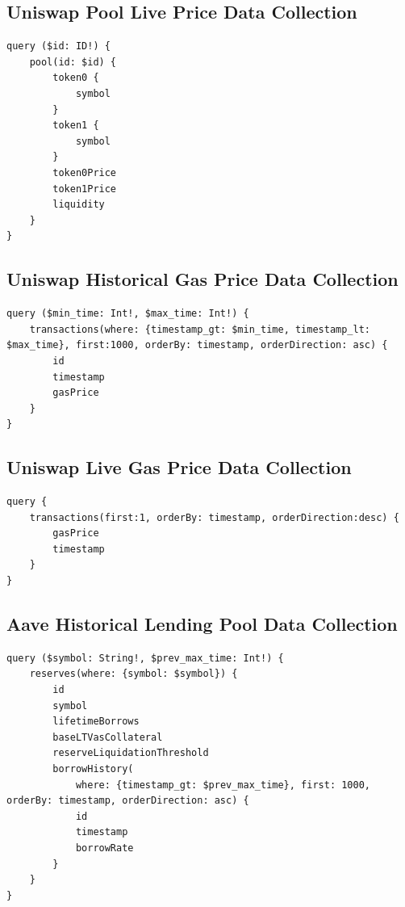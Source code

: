 \subsection{Uniswap Pool Live Price Data Collection \label{app:live-pool-price-query}}
\begin{lstlisting}[caption={GraphQL query to collect for live pricing data },captionpos=b]
query ($id: ID!) {
    pool(id: $id) {
        token0 {
            symbol
        }
        token1 {
            symbol
        }
        token0Price
        token1Price
        liquidity
    }
}
\end{lstlisting}

\subsection{Uniswap Historical Gas Price Data Collection}
\begin{lstlisting}[caption={GraphQL query to collect for gas pricing data \label{app:gas-query}},captionpos=b]
query ($min_time: Int!, $max_time: Int!) {
    transactions(where: {timestamp_gt: $min_time, timestamp_lt: $max_time}, first:1000, orderBy: timestamp, orderDirection: asc) {
        id
        timestamp
        gasPrice
    }
}
\end{lstlisting}

\subsection{Uniswap Live Gas Price Data Collection\label{app:live-gas-query}}
\begin{lstlisting}[caption={GraphQL query to collect for live gas price data},captionpos=b]
query {
    transactions(first:1, orderBy: timestamp, orderDirection:desc) {
        gasPrice
        timestamp
    }
}
\end{lstlisting}


\subsection{Aave Historical Lending Pool Data Collection \label{app:lending-query}}
\begin{lstlisting}[caption={GraphQL query to retrieve for lending pricing data},captionpos=b]
query ($symbol: String!, $prev_max_time: Int!) {
    reserves(where: {symbol: $symbol}) {
        id
        symbol
        lifetimeBorrows
        baseLTVasCollateral
        reserveLiquidationThreshold
        borrowHistory(
            where: {timestamp_gt: $prev_max_time}, first: 1000, orderBy: timestamp, orderDirection: asc) {
            id
            timestamp
            borrowRate
        }
    }
}
\end{lstlisting}


